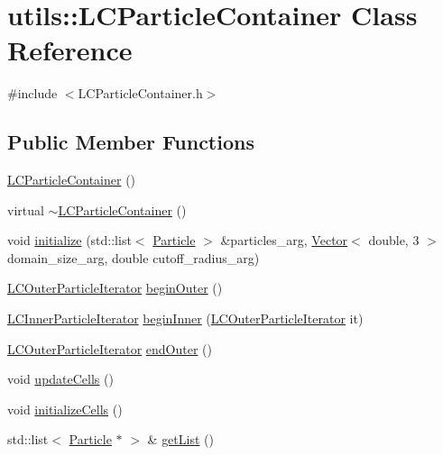 \hypertarget{classutils_1_1LCParticleContainer}{\section{utils\-:\-:L\-C\-Particle\-Container Class Reference}
\label{classutils_1_1LCParticleContainer}
}


{\ttfamily \#include $<$L\-C\-Particle\-Container.\-h$>$}

\subsection*{Public Member Functions}
\begin{DoxyCompactItemize}
\item 
\hyperlink{classutils_1_1LCParticleContainer_add8756a136a83f0e0fa0f7fd36815f60}{L\-C\-Particle\-Container} ()
\item 
virtual \hyperlink{classutils_1_1LCParticleContainer_a35dfa4284f12c4c5816d98159aeef290}{$\sim$\-L\-C\-Particle\-Container} ()
\item 
void \hyperlink{classutils_1_1LCParticleContainer_a231b598290b2de8e23cd0088b615ee55}{initialize} (std\-::list$<$ \hyperlink{classParticle}{Particle} $>$ \&particles\-\_\-arg, \hyperlink{classutils_1_1Vector}{Vector}$<$ double, 3 $>$ domain\-\_\-size\-\_\-arg, double cutoff\-\_\-radius\-\_\-arg)
\item 
\hyperlink{classutils_1_1LCOuterParticleIterator}{L\-C\-Outer\-Particle\-Iterator} \hyperlink{classutils_1_1LCParticleContainer_ad7336fb3a0f3c7e2b2ee386d6cfd1492}{begin\-Outer} ()
\item 
\hyperlink{classutils_1_1LCInnerParticleIterator}{L\-C\-Inner\-Particle\-Iterator} \hyperlink{classutils_1_1LCParticleContainer_aa0b5f32b138d37acd081b11a175f41dc}{begin\-Inner} (\hyperlink{classutils_1_1LCOuterParticleIterator}{L\-C\-Outer\-Particle\-Iterator} it)
\item 
\hyperlink{classutils_1_1LCOuterParticleIterator}{L\-C\-Outer\-Particle\-Iterator} \hyperlink{classutils_1_1LCParticleContainer_a2b0f9462d24e0fd53e5de15b15025d5e}{end\-Outer} ()
\item 
void \hyperlink{classutils_1_1LCParticleContainer_aad76a2af7f28d1f7b45df77a58b3f495}{update\-Cells} ()
\item 
void \hyperlink{classutils_1_1LCParticleContainer_afe1d2d7862829f48d9050c6402850fc7}{initialize\-Cells} ()
\item 
std\-::list$<$ \hyperlink{classParticle}{Particle} $\ast$ $>$ \& \hyperlink{classutils_1_1LCParticleContainer_a50aaac556c08452c7116377e7a104ae1}{get\-List} ()

\end{DoxyCompactItemize}
